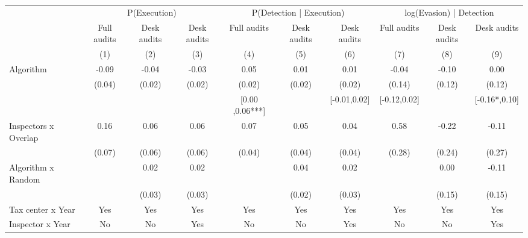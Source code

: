 \begin{tabular}{lccc|ccc|ccc} \toprule
\multicolumn{1}{l}{} & \multicolumn{3}{c}{P(Execution)} & \multicolumn{3}{c}{P(Detection | Execution)} & \multicolumn{3}{c}{log(Evasion) | Detection} \\\cmidrule(lr){2-4}\cmidrule(lr){5-7}\cmidrule(lr){8-10} \multicolumn{1}{l}{} & Full audits & Desk audits & Desk audits & Full audits & Desk audits & Desk audits & Full audits & Desk audits & Desk audits \\ \multicolumn{1}{l}{} & (1) & (2) & (3) & (4) & (5) & (6) & (7) & (8) & (9) \\ \midrule
Algorithm   &       -0.09\sym{**} &       -0.04         &       -0.03         &        0.05\sym{***}&        0.01         &        0.01         &       -0.04         &       -0.10         &        0.00         \\
            &      (0.04)         &      (0.02)         &      (0.02)         &      (0.02)         &      (0.02)         &      (0.02)         &      (0.14)         &      (0.12)         &      (0.12)         \\
\addlinespace
 & & & & [0.00 ,0.06***] & & [-0.01,0.02] & [-0.12,0.02] & & [-0.16*,0.10] \\  Inspectors x Overlap&        0.16\sym{**} &        0.06         &        0.06         &        0.07\sym{*}  &        0.05         &        0.04         &        0.58\sym{**} &       -0.22         &       -0.11         \\
            &      (0.07)         &      (0.06)         &      (0.06)         &      (0.04)         &      (0.04)         &      (0.04)         &      (0.28)         &      (0.24)         &      (0.27)         \\
\addlinespace
Algorithm x Random&                     &        0.02         &        0.02         &                     &        0.04\sym{*}  &        0.02         &                     &        0.00         &       -0.11         \\
            &                     &      (0.03)         &      (0.03)         &                     &      (0.02)         &      (0.03)         &                     &      (0.15)         &      (0.15)         \\
\midrule
Tax center x Year&         Yes         &         Yes         &         Yes         &         Yes         &         Yes         &         Yes         &         Yes         &         Yes         &         Yes         \\
Inspector x Year&          No         &          No         &         Yes         &          No         &          No         &         Yes         &          No         &          No         &         Yes         \\

\end{tabular}
